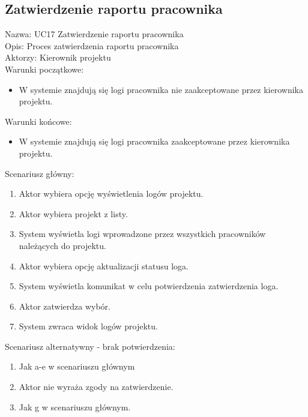 \subsection{Zatwierdzenie raportu pracownika}
Nazwa: UC17 Zatwierdzenie raportu pracownika \\
Opis: Proces zatwierdzenia raportu pracownika \\
Aktorzy: Kierownik projektu \\
Warunki początkowe:
\begin{itemize}
\item W systemie znajdują się logi pracownika nie zaakceptowane przez kierownika projektu.
\end{itemize}
Warunki końcowe:
\begin{itemize}
\item W systemie znajdują się logi pracownika zaakceptowane przez kierownika projektu.
\end{itemize}
Scenariusz główny:
\begin{enumerate}
\item Aktor wybiera opcję wyświetlenia logów projektu.
\item Aktor wybiera projekt z listy.
\item System wyświetla logi wprowadzone przez wszystkich pracowników należących do projektu.
\item Aktor wybiera opcję aktualizacji statusu loga.
\item System wyświetla komunikat w celu potwierdzenia zatwierdzenia loga.
\item Aktor zatwierdza wybór.
\item System zwraca widok logów projektu.
\end{enumerate}
Scenariusz alternatywny - brak potwierdzenia: 
\begin{enumerate}
\item Jak a-e w scenariuszu głównym
\item Aktor nie wyraża zgody na zatwierdzenie.
\item Jak g w scenariuszu głównym.
\end{enumerate}

